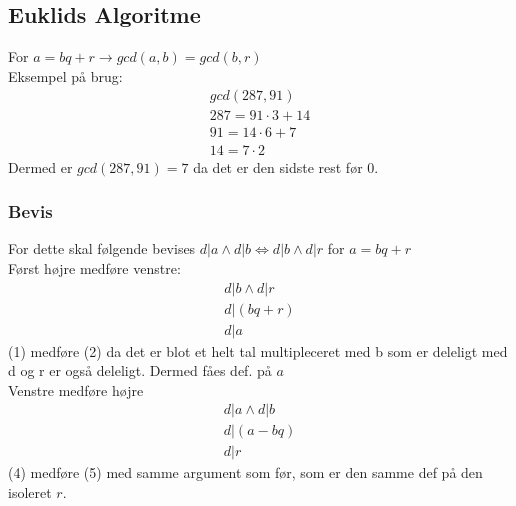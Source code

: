 \documentclass[12pt, a4paper]{article}
\begin{document}
		\subsection{Euklids Algoritme}
			For $a=bq+r \rightarrow gcd(a,b)=gcd(b,r)$\\
			Eksempel på brug:
			\begin{align*}
				gcd(287,91)\\
				287=91\cdot 3 + 14\\
				91=14\cdot 6 + 7\\
				14=7\cdot 2
			\end{align*}
			Dermed er $gcd(287,91)=7$ da det er den sidste rest før 0.
			\subsubsection{Bevis}
				For dette skal følgende bevises $d|a\land d|b \iff d|b\land d|r$ for $a=bq+r$\\
				Først højre medføre venstre:
				\begin{align}
					d|b\land d|r\\
					d|(bq+r)\\
					d|a
				\end{align}
				(1) medføre (2) da det er blot et helt tal multipleceret med b som er deleligt med d og r er også deleligt. Dermed fåes def. på $a$\\
				Venstre medføre højre\\
				\begin{align}
					d|a \land d|b\\
					d|(a-bq)\\
					d|r
				\end{align}
				(4) medføre (5) med samme argument som før, som er den samme def på den isoleret $r$.
\end{document}

